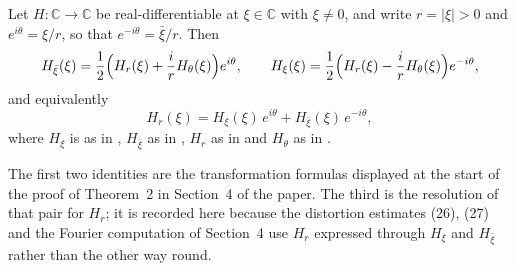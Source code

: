 \begin{lemma}
Let $H\colon\mathbb{C}\to\mathbb{C}$ be real-differentiable at
$\xi\in\mathbb{C}$ with $\xi\neq0$, and write $r=|\xi|>0$ and
$e^{i\theta}=\xi/r$, so that $e^{-i\theta}=\bar\xi/r$.  Then
\[
  H_{\bar\xi}(\xi)=\frac12\Bigl(H_r(\xi)+\frac ir H_\theta(\xi)\Bigr)e^{i\theta},
  \qquad
  H_\xi(\xi)=\frac12\Bigl(H_r(\xi)-\frac ir H_\theta(\xi)\Bigr)e^{-i\theta},
\]
and equivalently
\[
  H_r(\xi)=H_\xi(\xi)\,e^{i\theta}+H_{\bar\xi}(\xi)\,e^{-i\theta},
\]
where $H_\xi$ is as in , $H_{\bar\xi}$ as in ,
$H_r$ as in  and $H_\theta$ as in .

The first two identities are the transformation formulas displayed at the start
of the proof of Theorem~2 in Section~4 of the paper.  The third is the
resolution of that pair for $H_r$; it is recorded here because the distortion
estimates (26), (27) and the Fourier computation of Section~4 use $H_r$
expressed through $H_\xi$ and $H_{\bar\xi}$ rather than the other way round.
\end{lemma}
